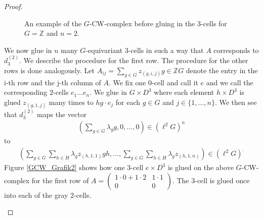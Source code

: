 \documentclass[12pt,a4paper]{scrartcl}
\theoremstyle{plain}
\theoremstyle{definition}
\numberwithin{equation}{section}
\newcommand{\Z}{\mathbb{Z}} %
\newcommand{\2}{\mathbb{Z} / 2 \mathbb{Z}}
\newcommand{\1}{\bar{1}}
\newcommand{\0}{\bar{0}}
\begin{document}
\begin{proof}
\begin{figure}[H]
		\caption{An example of the $G$-CW-complex before gluing in the $3$-cells for $G = \Z$ and $n=2$.}
		\label{GCW_Grafik}
	\end{figure}
	
	We now glue in $n$ many $G$-equivariant $3$-cells in such a way that $A$ corresponds to $d_3^{(2)}$. We describe the procedure for the first row. The procedure for the other rows is done analogously.
	Let $A_{ij} = \sum_{g \in G} z_{(g, i, j)} g \in \Z G$ denote the entry in the i-th row and the j-th column of $A$. We fix one $0$-cell and call it $e$ and we call the corresponding $2$-cells $e_1 \ldots e_n$. We glue in $G \times D^3$ where each element $h \times D^3$ is glued $z_{(g, 1, j)}$ many times to $h g \cdot e_j$ for each $g \in G$ and $j \in \{1, \ldots, n\}$. We then see that $d_3^{(2)}$ maps the vector 
	\begin{align*}
		(\sum_{g \in G} \lambda_g g, 0 , \ldots , 0) \in (\ell^2 G)^n
	\end{align*}
	to
	\begin{align*}
		(\sum_{g \in G} \sum_{h \in H} \lambda_g z_{(h, 1, 1)} g h, \ldots , \sum_{g \in G} \sum_{h \in H} \lambda_g z_{(h, 1, n)}) \in (\ell^2 G)^.
	\end{align*}
	Figure \ref{GCW_Grafik2} shows how one $3$-cell $e \times D^3$ is glued on the above $G$-CW-complex for the first row of $A= \begin{pmatrix}
		1 \cdot 0 + 1 \cdot 2 & 1 \cdot 1 \\
		0 & 0
		\end{pmatrix}$. The $3$-cell is glued once into each of the gray $2$-cells.
		\begin{figure}[H]
			\centering
\end{figure}
\end{proof}
\end{document}
